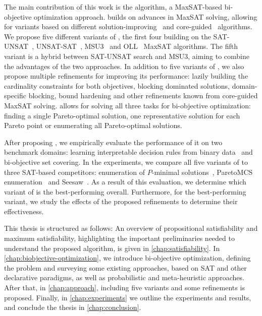 The main contribution of this work is the \algname{} algorithm, a MaxSAT-based bi-objective optimization approach.
\algname{} builds on advances in MaxSAT solving, allowing for variants based on different solution-improving~\autocites{handbook2-maxsat,DBLP:journals/jsat/BerreP10,DBLP:journals/jsat/EenS06} and core-guided~\autocites{DBLP:journals/corr/abs-0712-1097,DBLP:conf/sat/AnsoteguiBL09,DBLP:conf/cp/MorgadoDM14,DBLP:journals/jsat/IgnatievMM19} algorithms.
We propose five different variants of \algname{}, the first four building on the SAT-UNSAT~\autocite{DBLP:journals/jsat/BerreP10}, UNSAT-SAT~\autocite{DBLP:conf/sat/FuM06}, MSU3~\autocite{DBLP:journals/corr/abs-0712-1097} and OLL~\autocite{DBLP:conf/cp/MorgadoDM14} MaxSAT algorithms.
The fifth variant is a hybrid between SAT-UNSAT search and MSU3, aiming to combine the advantages of the two approaches.
In addition to five variants of \algname{}, we also propose multiple refinements for improving its performance:
lazily building the cardinality constraints for both objectives, blocking dominated solutions, domain-specific blocking, bound hardening and other refinements known from core-guided MaxSAT solving.
\algname{} allows for solving all three tasks for bi-objective optimization:
finding a single Pareto-optimal solution, one representative solution for each Pareto point or enumerating all Pareto-optimal solutions.

After proposing \algname{}, we empirically evaluate the performance of it on two benchmark domains:
learning interpretable decision rules from binary data~\autocite{DBLP:conf/cp/MaliotovM18} and bi-objective set covering.
In the experiments, we compare all five variants of \algname{} to three SAT-based competitors:
enumeration of $P$-minimal solutions~\autocite{DBLP:conf/cp/SohBTB17}, ParetoMCS enumeration~\autocite{DBLP:conf/ijcai/Terra-NevesLM18a} and Seesaw~\autocite{DBLP:conf/cp/JanotaMSM21}.
As a result of this evaluation, we determine which variant of \algname{} is the best-performing overall.
Furthermore, for the best-performing variant, we study the effects of the proposed refinements to determine their effectiveness.

This thesis is structured as follows:
An overview of propositional satisfiability and maximum satisfiability, highlighting the important preliminaries needed to understand the proposed algorithm, is given in \cref{chap:satisfiability}.
In \cref{chap:biobjective-optimization}, we introduce bi-objective optimization, defining the problem and surveying some existing approaches, based on SAT and other declarative paradigms, as well as probabilistic and meta-heuristic approaches.
After that, in \cref{chap:approach}, \algname{} including five variants and some refinements is proposed.
Finally, in \cref{chap:experiments} we outline the experiments and results, and conclude the thesis in \cref{chap:conclusion}.